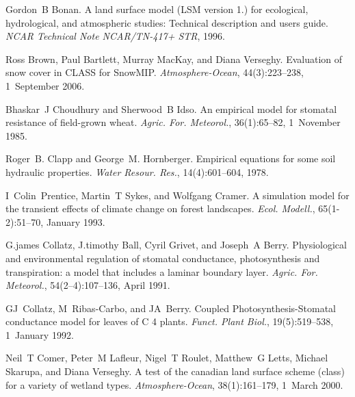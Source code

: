 \begin{DoxyDescription}
\item[\label{_CITEREF_Bonan1996-as}%
\mbox{[}16\mbox{]}]Gordon~B Bonan. A land surface model (L\+S\+M version 1.) for ecological, hydrological, and atmospheric studies\+: Technical description and user\textquotesingle{}s guide. {\itshape N\+C\+A\+R Technical Note N\+C\+A\+R/\+T\+N-\/417+ S\+T\+R}, 1996.


\item[\label{_CITEREF_Brown2006-ec}%
\mbox{[}17\mbox{]}]Ross Brown, Paul Bartlett, Murray Mac\+Kay, and Diana Verseghy. Evaluation of snow cover in C\+L\+A\+S\+S for Snow\+M\+I\+P. {\itshape Atmosphere-\/\+Ocean}, 44(3)\+:223--238, 1~September 2006. 


\item[\label{_CITEREF_Choudhury1985-mm}%
\mbox{[}18\mbox{]}]Bhaskar~J Choudhury and Sherwood~B Idso. An empirical model for stomatal resistance of field-\/grown wheat. {\itshape Agric. For. Meteorol.}, 36(1)\+:65--82, 1~November 1985. 


\item[\label{_CITEREF_Clapp1978-898}%
\mbox{[}19\mbox{]}]Roger~B. Clapp and George~M. Hornberger. Empirical equations for some soil hydraulic properties. {\itshape Water Resour. Res.}, 14(4)\+:601--604, 1978. 


\item[\label{_CITEREF_Prentice1993-xn}%
\mbox{[}20\mbox{]}]I~Colin~Prentice, Martin~T Sykes, and Wolfgang Cramer. A simulation model for the transient effects of climate change on forest landscapes. {\itshape Ecol. Modell.}, 65(1-\/2)\+:51--70, January 1993. 


\item[\label{_CITEREF_Collatz1991-5bc}%
\mbox{[}21\mbox{]}]G.\+james Collatz, J.\+timothy Ball, Cyril Grivet, and Joseph~A Berry. Physiological and environmental regulation of stomatal conductance, photosynthesis and transpiration\+: a model that includes a laminar boundary layer. {\itshape Agric. For. Meteorol.}, 54(2–4)\+:107--136, April 1991. 


\item[\label{_CITEREF_Collatz1992-jf}%
\mbox{[}22\mbox{]}]G\+J~Collatz, M~Ribas-\/\+Carbo, and J\+A~Berry. Coupled Photosynthesis-\/\+Stomatal conductance model for leaves of C 4 plants. {\itshape Funct. Plant Biol.}, 19(5)\+:519--538, 1~January 1992. 


\item[\label{_CITEREF_Comer2000-mz}%
\mbox{[}23\mbox{]}]Neil~T Comer, Peter~M Lafleur, Nigel~T Roulet, Matthew~G Letts, Michael Skarupa, and Diana Verseghy. A test of the canadian land surface scheme (class) for a variety of wetland types. {\itshape Atmosphere-\/\+Ocean}, 38(1)\+:161--179, 1~March 2000. 



\end{DoxyDescription}
